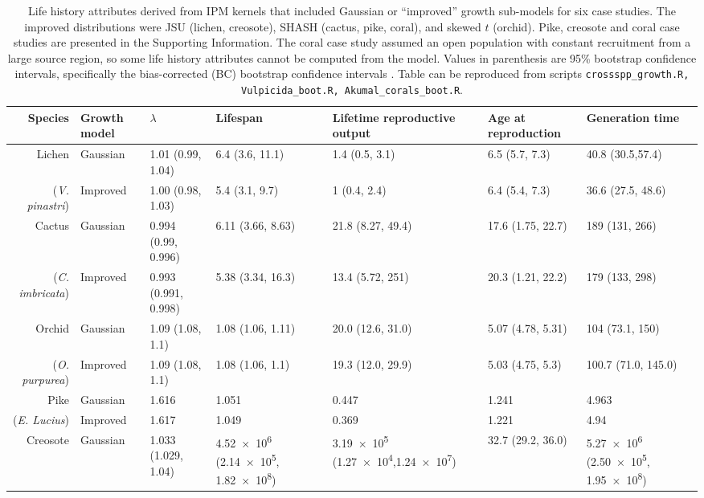 \documentclass[12pt]{article}
\begin{document}
\begin{spacing}{1.9}
\begin{table}[tbp]
\renewcommand{\arraystretch}{1.5}
	\caption{Life history attributes derived from IPM kernels that included Gaussian or ``improved'' growth sub-models for six  case studies. The improved distributions were JSU (lichen, creosote), SHASH (cactus, pike, coral), and skewed $t$ (orchid). 
	Pike, creosote and coral case studies are presented in the Supporting Information. The coral case study assumed an open population with constant recruitment from a large source region, so some life history
	attributes cannot be computed from the model. Values in parenthesis are 95\% bootstrap confidence intervals, specifically the bias-corrected (BC) bootstrap confidence intervals \cite{bca-1996}. Table can be reproduced from scripts \texttt{crossspp\_growth.R, Vulpicida\_boot.R, Akumal\_corals\_boot.R}.}
	\centering
	\begingroup\fontsize{10pt}{10pt}\selectfont
	\begin{tabular}{rp{1.1cm}|p{2.4cm}p{2.4cm}p{2.4cm}p{2.4cm}p{2.4cm}}
	{\textbf{Species}} & {\textbf{Growth model}} & {\textbf{$\lambda$}} & {\textbf{Lifespan}} & {\textbf{Lifetime reproductive output}} & {\textbf{Age at reproduction}} & {\textbf{Generation time}} \\ 
	\hline
		Lichen & Gaussian & 1.01 (0.99, 1.04) & 6.4 (3.6, 11.1) & 1.4 (0.5, 3.1) & 6.5 (5.7, 7.3) & 40.8 (30.5,57.4)\\ 
	(\textit{V. pinastri}) & Improved & 1.00 (0.98, 1.03) & 5.4 (3.1, 9.7) & 1 (0.4, 2.4) & 6.4 (5.4, 7.3) & 36.6 (27.5, 48.6)\\ 
	\hline
	Cactus & Gaussian & 0.994 (0.99, 0.996) & 6.11 (3.66, 8.63) & 21.8 (8.27, 49.4) & 17.6 (1.75, 22.7) & 189 (131, 266) \\ 
	(\textit{C. imbricata}) & Improved & 0.993 (0.991, 0.998) & 5.38 (3.34, 16.3) & 13.4 (5.72, 251) & 20.3 (1.21, 22.2) & 179 (133, 298) \\
	\hline
	Orchid & Gaussian & 1.09 (1.08, 1.1) & 1.08 (1.06, 1.11) & 20.0 (12.6, 31.0) & 5.07 (4.78, 5.31) & 104 (73.1, 150)\\ 
	(\textit{O. purpurea}) & Improved & 1.09 (1.08, 1.1) & 1.08 (1.06, 1.1) & 19.3 (12.0, 29.9) & 5.03 (4.75, 5.3) & 100.7 (71.0, 145.0) \\ 
	\hline
	Pike & Gaussian & 1.616 & 1.051 & 0.447 & 1.241 & 4.963 \\ 
	(\textit{E. Lucius}) & Improved & 1.617 & 1.049 & 0.369 & 1.221 & 4.94 \\ 
	\hline
	Creosote & Gaussian & 1.033 (1.029, 1.04) & \num{4.52e6} (\num{2.14e5}, \num{1.82e8}) & \num{3.19e5} (\num{1.27e4},\num{1.24e7}) & 32.7 (29.2, 36.0) & \num{5.27e6} (\num{2.50e5}, \num{1.95e8}) \\ 

\end{tabular}
\end{table}
\end{spacing}
\end{document}
